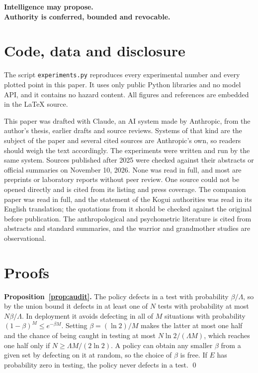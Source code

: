 \documentclass[10pt,twocolumn,letterpaper]{article}
\theoremstyle{definition}
\begin{document}
\begin{center}
\textbf{Intelligence may propose.\\ Authority is conferred, bounded and revocable.}
\end{center}

\section*{Code, data and disclosure}

The script \texttt{experiments.py} reproduces every experimental number and every plotted point in this paper. It uses only public Python libraries and no model API, and it contains no hazard content. All figures and references are embedded in the \LaTeX{} source.

This paper was drafted with Claude, an AI system made by Anthropic, from the author's thesis, earlier drafts and source reviews. Systems of that kind are the subject of the paper and several cited sources are Anthropic's own, so readers should weigh the text accordingly. The experiments were written and run by the same system. Sources published after 2025 were checked against their abstracts or official summaries on November 10, 2026. None was read in full, and most are preprints or laboratory reports without peer review. One source \cite{controlroom} could not be opened directly and is cited from its listing and press coverage. The companion paper \cite{taylor} was read in full, and the statement of the Kogui authorities \cite{kogui} was read in its English translation; the quotations from it should be checked against the original before publication. The anthropological and psychometric literature is cited from abstracts and standard summaries, and the warrior and grandmother studies are observational.

\appendix

\section{Proofs}
\label{app:proofs}

\textbf{Proposition~\ref{prop:audit}.} The policy defects in a test with probability $\beta/\Lambda$, so by the union bound it defects in at least one of $N$ tests with probability at most $N\beta/\Lambda$. In deployment it avoids defecting in all of $M$ situations with probability $(1-\beta)^{M}\le e^{-\beta M}$. Setting $\beta=(\ln 2)/M$ makes the latter at most one half and the chance of being caught in testing at most $N\ln 2/(\Lambda M)$, which reaches one half only if $N\ge\Lambda M/(2\ln 2)$. A policy can obtain any smaller $\beta$ from a given set by defecting on it at random, so the choice of $\beta$ is free. If $E$ has probability zero in testing, the policy never defects in a test. \qed
\end{document}
